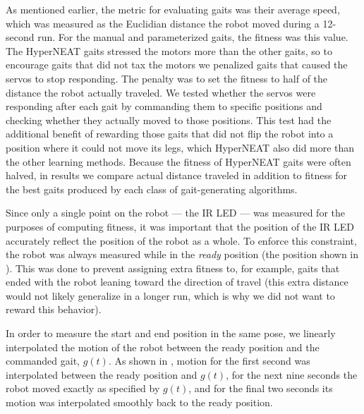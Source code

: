 As mentioned earlier, the metric for evaluating gaits was their
average speed, which was measured as the Euclidian distance the robot
moved during a 12-second run. For the manual and parameterized gaits, the fitness was this value. The HyperNEAT gaits stressed the motors more than the other gaits, so to encourage gaits that did not tax the motors we penalized gaits that caused the servos to stop responding. The penalty was to set the fitness to half of the distance the robot actually traveled. We tested whether the servos were responding after each gait by commanding them to specific positions and checking whether they actually moved to those positions. This test had the additional benefit of rewarding those gaits that did not flip the robot into a position where it could not move its legs, which HyperNEAT also did more than the other learning methods. Because the fitness of HyperNEAT gaits were often halved, in results we compare actual distance traveled in addition to fitness for the best gaits produced by each class of gait-generating algorithms. 

Since only a single point on the robot --- the IR LED --- was measured
for the purposes of computing fitness, it was important that the
position of the IR LED accurately reflect the position of the robot as
a whole.  To enforce this constraint, the robot was always measured
while in the \emph{ready} position (the position shown in
).  This was done to prevent assigning extra
fitness to, for example, gaits that ended with the robot leaning toward
the direction of travel (this extra distance would not likely generalize
in a longer run, which is why we did not want to reward this behavior).

In order to measure the start and end position in the same pose, we
linearly interpolated the motion of the robot between the ready
position and the commanded gait, $g(t)$.  As shown in
, motion for the first second was interpolated
between the ready position and $g(t)$, for the next nine seconds the
robot moved exactly as specified by $g(t)$, and for the final two
seconds its motion was interpolated smoothly back to the ready
position.



